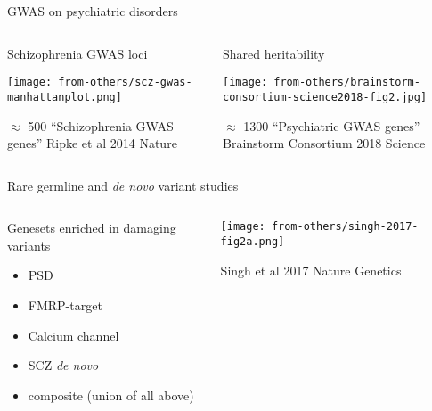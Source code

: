 \documentclass[usenames,dvipsnames]{beamer}
\begin{document}
\begin{frame}[label=gwas]{GWAS on psychiatric disorders}

\begin{columns}[t]
\begin{column}{0.5\textwidth}
\begin{center}
Schizophrenia GWAS loci

\texttt{[image: from-others/scz-gwas-manhattanplot.png]}

\footnotesize
\(\approx\) 500 ``Schizophrenia GWAS genes''
{\tiny Ripke et al 2014 Nature}
\end{center}
\end{column}

\begin{column}{0.5\textwidth}
Shared heritability

\texttt{[image: from-others/brainstorm-consortium-science2018-fig2.jpg]}

\footnotesize
\(\approx\) 1300 ``Psychiatric GWAS genes''
{\tiny Brainstorm Consortium 2018 Science}
\end{column}
\end{columns}
\end{frame}

\begin{frame}[label=rare]{Rare germline and \textit{de novo} variant studies}
\begin{columns}[t]
\begin{column}{0.5\textwidth}
Genesets enriched in \alert{damaging} variants
\begin{itemize}
\item PSD
\item FMRP-target
\item Calcium channel
\item SCZ \textit{de novo}
\item composite (union of all above)
\end{itemize}
\end{column}

\begin{column}{0.5\textwidth}

\texttt{[image: from-others/singh-2017-fig2a.png]}

\tiny Singh et al 2017 Nature Genetics
\end{column}
\end{columns}
\end{frame}
\end{document}
